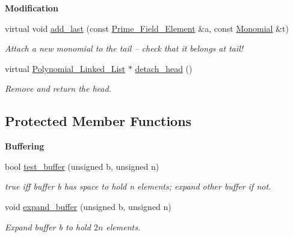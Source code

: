 \begin{Indent}\textbf{ Modification}\par
\begin{DoxyCompactItemize}
\item 
\mbox{\label{class_double___buffered___polynomial_a9ea67190d302340e35d1318a32df0c66}} 
virtual void \hyperlink{class_double___buffered___polynomial_a9ea67190d302340e35d1318a32df0c66}{add\+\_\+last} (const \hyperlink{class_prime___field___element}{Prime\+\_\+\+Field\+\_\+\+Element} \&a, const \hyperlink{class_monomial}{Monomial} \&t)
\begin{DoxyCompactList}\small\item\em Attach a new monomial to the tail -- check that it belongs at tail! \end{DoxyCompactList}\item 
\mbox{\label{class_double___buffered___polynomial_aa1abce108245118a97c9086dd9726fea}} 
virtual \hyperlink{class_polynomial___linked___list}{Polynomial\+\_\+\+Linked\+\_\+\+List} $\ast$ \hyperlink{class_double___buffered___polynomial_aa1abce108245118a97c9086dd9726fea}{detach\+\_\+head} ()
\begin{DoxyCompactList}\small\item\em Remove and return the head. \end{DoxyCompactList}\end{DoxyCompactItemize}
\end{Indent}
\subsection*{Protected Member Functions}
\begin{Indent}\textbf{ Buffering}\par
\begin{DoxyCompactItemize}
\item 
\mbox{\label{class_double___buffered___polynomial_a399d8bc13840f21ab8a1b8c844053eb9}} 
bool \hyperlink{class_double___buffered___polynomial_a399d8bc13840f21ab8a1b8c844053eb9}{test\+\_\+buffer} (unsigned b, unsigned n)
\begin{DoxyCompactList}\small\item\em {\ttfamily true} iff buffer {\ttfamily b} has space to hold {\ttfamily n} elements; expand other buffer if not. \end{DoxyCompactList}\item 
void \hyperlink{class_double___buffered___polynomial_acd9235d4fe5a56a3a0842a80b4efbdbb}{expand\+\_\+buffer} (unsigned b, unsigned n)
\begin{DoxyCompactList}\small\item\em Expand buffer {\ttfamily b} to hold $ 2n $ elements. \end{DoxyCompactList}\end{DoxyCompactItemize}
\end{Indent}
